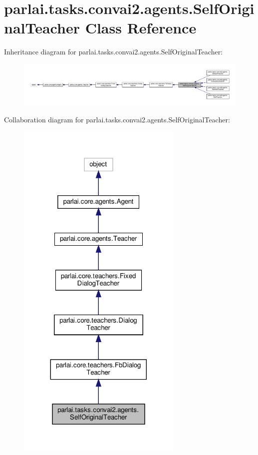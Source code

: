 \hypertarget{classparlai_1_1tasks_1_1convai2_1_1agents_1_1SelfOriginalTeacher}{}\section{parlai.\+tasks.\+convai2.\+agents.\+Self\+Original\+Teacher Class Reference}
\label{classparlai_1_1tasks_1_1convai2_1_1agents_1_1SelfOriginalTeacher}


Inheritance diagram for parlai.\+tasks.\+convai2.\+agents.\+Self\+Original\+Teacher\+:
\nopagebreak
\begin{figure}[H]
\begin{center}
\leavevmode
\includegraphics[width=350pt]{d0/d6e/classparlai_1_1tasks_1_1convai2_1_1agents_1_1SelfOriginalTeacher__inherit__graph}
\end{center}
\end{figure}


Collaboration diagram for parlai.\+tasks.\+convai2.\+agents.\+Self\+Original\+Teacher\+:
\nopagebreak
\begin{figure}[H]
\begin{center}
\leavevmode
\includegraphics[width=224pt]{d5/db8/classparlai_1_1tasks_1_1convai2_1_1agents_1_1SelfOriginalTeacher__coll__graph}
\end{center}
\end{figure}
